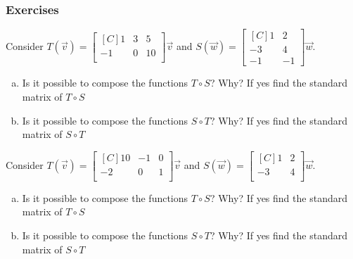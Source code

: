 \subsubsection{Exercises}
\begin{exercise}
Consider
$T(\vec{v})=\begin{bmatrix*}[C]
1  & 3  & 5 \\
-1 & 0  & 10 \\
\end{bmatrix*}\vec{v}$
and $S(\vec{w})=\begin{bmatrix*}[C]
1 & 2 \\
-3 & 4 \\
-1 & -1
\end{bmatrix*}\vec{w}$.
\begin{enumerate}[a)]
\item Is it possible to compose the functions $T \circ S$? Why? If yes find the standard matrix of $T \circ S$
\item Is it possible to compose the functions $S \circ T$? Why? If yes find the standard matrix of $S \circ T$
\end{enumerate}
\end{exercise}

\begin{exercise}
Consider
$T(\vec{v})=\begin{bmatrix*}[C]
10  & -1  & 0 \\
-2 & 0  & 1 \\
\end{bmatrix*}\vec{v}$
and $S(\vec{w})=\begin{bmatrix*}[C]
1 & 2 \\
-3 & 4 \\
\end{bmatrix*}\vec{w}$.
\begin{enumerate}[a)]
\item Is it possible to compose the functions $T \circ S$? Why? If yes find the standard matrix of $T \circ S$
\item Is it possible to compose the functions $S \circ T$? Why? If yes find the standard matrix of $S \circ T$
\end{enumerate}
\end{exercise}

